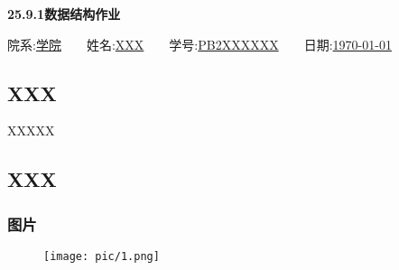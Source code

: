 \documentclass[12pt, a4paper, oneside]{ctexart}
\begin{document}
\begin{center} \Huge\textbf{25.9.1数据结构作业}\normalsize\\ \end{center}
\vspace{2ex}

\begin{center}
    院系:\underline{学院}$\qquad$姓名:\underline{XXX}$\qquad$学号:\underline{PB2XXXXXX}$\qquad$日期:\underline{\today}
\end{center}
\vspace{2ex}


\subsection*{XXX}
    \indent XXXXX

\subsection*{XXX}
    \subsubsection*{图片}
    \begin{figure}[H]                       
        \centering 
        \texttt{[image: pic/1.png]}
    \end{figure}
\end{document}
